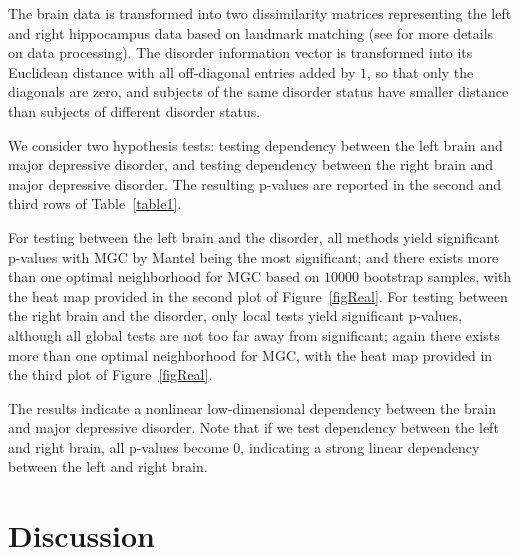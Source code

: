 \documentclass[11pt]{article}
\begin{document}
The brain data is transformed into two dissimilarity matrices representing the left and right hippocampus data based on landmark matching (see \cite{ParkEtAl2011} for more details on data processing). The disorder information vector is transformed into its Euclidean distance with all off-diagonal entries added by $1$, so that only the diagonals are zero, and subjects of the same disorder status have smaller distance than subjects of different disorder status.

We consider two hypothesis tests: testing dependency between the left brain and major depressive disorder, and testing dependency between the right brain and major depressive disorder. The resulting p-values are reported in the second and third rows of Table~\ref{table1}.

For testing between the left brain and the disorder, all methods yield significant p-values with MGC by Mantel being the most significant; and there exists more than one optimal neighborhood for MGC based on $10000$ bootstrap samples, with the heat map provided in the second plot of Figure~\ref{figReal}. For testing between the right brain and the disorder, only local tests yield significant p-values, although all global tests are not too far away from significant; again there exists more than one optimal neighborhood for MGC, with the heat map provided in the third plot of Figure~\ref{figReal}. 


The results indicate a nonlinear low-dimensional dependency between the brain and major depressive disorder. Note that if we test dependency between the left and right brain, all p-values become $0$, indicating a strong linear dependency between the left and right brain.

\section{Discussion}
\label{conclu}
\end{document}
